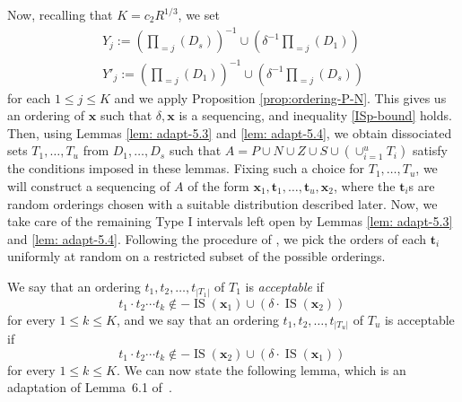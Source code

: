 \documentclass[11pt]{amsart}
\theoremstyle{definition}
\DeclareMathOperator{\IS}{IS}
\begin{document}
Now, recalling that $K=c_2 R^{1/3}$, we set
\begin{align}\label{eq: defY}
    Y_j := \left( \prod_{=j} (D_s) \right)^{-1} \cup \left( \delta^{-1} \prod_{=j} (D_1) \right) \\ \label{eq: defY'}
     Y'_j := \left( \prod_{=j} (D_1) \right)^{-1} \cup \left( \delta^{-1} \prod_{=j} (D_s) \right)
\end{align}
for each $1\leq j \leq K$ and we apply Proposition \ref{prop:ordering-P-N}. This gives us an ordering of $\mathbf{x}$ such that $\delta, \mathbf{x}$ is a sequencing, and inequality \eqref{ISp-bound} holds. Then, using Lemmas \ref{lem: adapt-5.3} and \ref{lem: adapt-5.4}, we obtain dissociated sets $T_1, \ldots, T_u$ from $D_1, \ldots, D_s$ such that $A = P \cup N \cup Z \cup S \cup \left( \cup_{i=1}^u T_i \right)$ satisfy the conditions imposed in these lemmas. Fixing such a choice for $T_1, \ldots, T_u$, we will construct a sequencing of $A$ of the form $\mathbf{x}_1, \mathbf{t}_1, \ldots, \mathbf{t}_u, \mathbf{x}_2$, where the $\mathbf{t}_i$s are random orderings chosen with a suitable distribution described later. Now, we take care of the remaining Type I intervals left open by Lemmas \ref{lem: adapt-5.3} and \ref{lem: adapt-5.4}. Following the procedure of \cite{BK}, we pick the orders of each $\mathbf{t}_i$ uniformly at random on a restricted subset of the possible orderings.

We say that an ordering $t_1, t_2, \ldots, t_{|T_1|}$ of $T_1$ is \emph{acceptable} if 
$$t_1  \cdot t_2 \cdots t_k \not \in -\IS(\mathbf{x}_1) \cup \left(\delta \cdot \IS(\mathbf{x}_2)\right) \,$$
for every $1\leq k \leq K$, and we say that an ordering $t_1, t_2, \ldots, t_{|T_u|}$ of $T_u$ is acceptable if
$$
t_1  \cdot t_2 \cdots t_k \not \in -\IS(\mathbf{x}_2) \cup \left(\delta \cdot \IS(\mathbf{x}_1)\right) \,
$$
for every $1\leq k \leq K$. We can now state the following lemma, which is an adaptation of Lemma~6.1 of~\cite{BK}.
\end{document}
